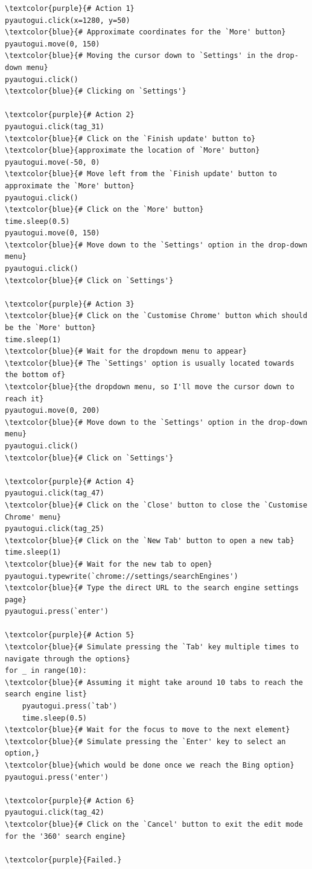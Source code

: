 \begin{tcolorbox}[title={Chrome Task: \textit{Can you make Bing the main search thingy when I look stuff up on the internet?}}]

\begin{Verbatim}[commandchars=\\\{\}]
\textcolor{purple}{# Action 1}
pyautogui.click(x=1280, y=50)  
\textcolor{blue}{# Approximate coordinates for the `More' button}
pyautogui.move(0, 150)  
\textcolor{blue}{# Moving the cursor down to `Settings' in the drop-down menu}
pyautogui.click()  
\textcolor{blue}{# Clicking on `Settings'}

\textcolor{purple}{# Action 2}
pyautogui.click(tag_31)  
\textcolor{blue}{# Click on the `Finish update' button to}
\textcolor{blue}{approximate the location of `More' button}
pyautogui.move(-50, 0)  
\textcolor{blue}{# Move left from the `Finish update' button to approximate the `More' button}
pyautogui.click()  
\textcolor{blue}{# Click on the `More' button}
time.sleep(0.5)
pyautogui.move(0, 150)  
\textcolor{blue}{# Move down to the `Settings' option in the drop-down menu}
pyautogui.click()  
\textcolor{blue}{# Click on `Settings'}

\textcolor{purple}{# Action 3}
\textcolor{blue}{# Click on the `Customise Chrome' button which should be the `More' button}
time.sleep(1)  
\textcolor{blue}{# Wait for the dropdown menu to appear}
\textcolor{blue}{# The `Settings' option is usually located towards the bottom of}
\textcolor{blue}{the dropdown menu, so I'll move the cursor down to reach it}
pyautogui.move(0, 200)  
\textcolor{blue}{# Move down to the `Settings' option in the drop-down menu}
pyautogui.click()  
\textcolor{blue}{# Click on `Settings'}

\textcolor{purple}{# Action 4}
pyautogui.click(tag_47)  
\textcolor{blue}{# Click on the `Close' button to close the `Customise Chrome' menu}
pyautogui.click(tag_25)  
\textcolor{blue}{# Click on the `New Tab' button to open a new tab}
time.sleep(1)  
\textcolor{blue}{# Wait for the new tab to open}
pyautogui.typewrite(`chrome://settings/searchEngines')  
\textcolor{blue}{# Type the direct URL to the search engine settings page}
pyautogui.press(`enter')

\textcolor{purple}{# Action 5}
\textcolor{blue}{# Simulate pressing the `Tab' key multiple times to navigate through the options}
for _ in range(10):  
\textcolor{blue}{# Assuming it might take around 10 tabs to reach the search engine list}    
    pyautogui.press(`tab')    
    time.sleep(0.5)  
\textcolor{blue}{# Wait for the focus to move to the next element}
\textcolor{blue}{# Simulate pressing the `Enter' key to select an option,}
\textcolor{blue}{which would be done once we reach the Bing option}
pyautogui.press('enter')

\textcolor{purple}{# Action 6}
pyautogui.click(tag_42)  
\textcolor{blue}{# Click on the `Cancel' button to exit the edit mode for the '360' search engine}

\textcolor{purple}{Failed.}
\end{Verbatim}
\end{tcolorbox}

